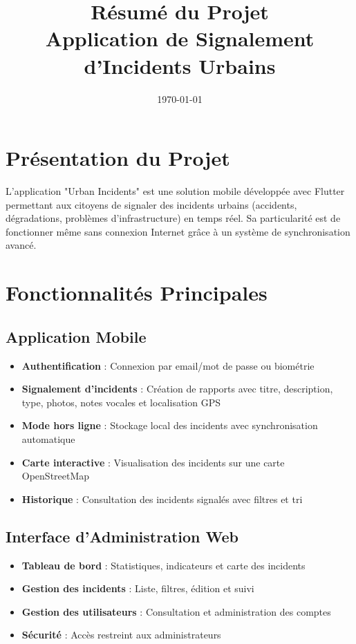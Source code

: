 \documentclass[12pt,a4paper]{article}
\title{\LARGE\textbf{Résumé du Projet\\Application de Signalement d'Incidents Urbains}}
\date{\today}
\begin{document}
\maketitle

\section*{Présentation du Projet}

L'application "Urban Incidents" est une solution mobile développée avec Flutter permettant aux citoyens de signaler des incidents urbains (accidents, dégradations, problèmes d'infrastructure) en temps réel. Sa particularité est de fonctionner même sans connexion Internet grâce à un système de synchronisation avancé.

\section*{Fonctionnalités Principales}

\subsection*{Application Mobile}

\begin{itemize}
    \item \textbf{Authentification} : Connexion par email/mot de passe ou biométrie
    \item \textbf{Signalement d'incidents} : Création de rapports avec titre, description, type, photos, notes vocales et localisation GPS
    \item \textbf{Mode hors ligne} : Stockage local des incidents avec synchronisation automatique
    \item \textbf{Carte interactive} : Visualisation des incidents sur une carte OpenStreetMap
    \item \textbf{Historique} : Consultation des incidents signalés avec filtres et tri
\end{itemize}

\subsection*{Interface d'Administration Web}

\begin{itemize}
    \item \textbf{Tableau de bord} : Statistiques, indicateurs et carte des incidents
    \item \textbf{Gestion des incidents} : Liste, filtres, édition et suivi
    \item \textbf{Gestion des utilisateurs} : Consultation et administration des comptes
    \item \textbf{Sécurité} : Accès restreint aux administrateurs
\end{itemize}
\end{document}
